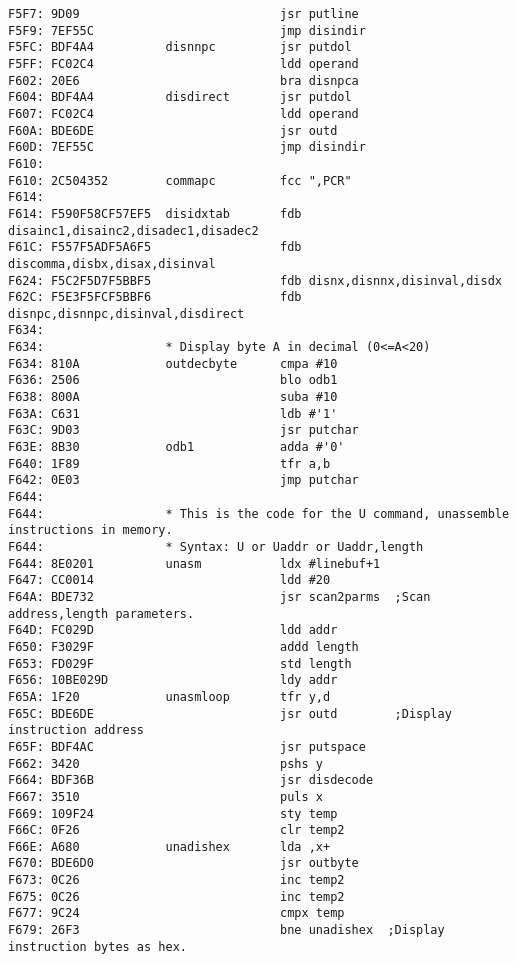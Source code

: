 {\begin{verbatim}
F5F7: 9D09                            jsr putline
F5F9: 7EF55C                          jmp disindir
F5FC: BDF4A4          disnnpc         jsr putdol
F5FF: FC02C4                          ldd operand
F602: 20E6                            bra disnpca
F604: BDF4A4          disdirect       jsr putdol
F607: FC02C4                          ldd operand
F60A: BDE6DE                          jsr outd                
F60D: 7EF55C                          jmp disindir
F610:                 
F610: 2C504352        commapc         fcc ",PCR"
F614:                 
F614: F590F58CF57EF5  disidxtab       fdb disainc1,disainc2,disadec1,disadec2
F61C: F557F5ADF5A6F5                  fdb discomma,disbx,disax,disinval
F624: F5C2F5D7F5BBF5                  fdb disnx,disnnx,disinval,disdx
F62C: F5E3F5FCF5BBF6                  fdb disnpc,disnnpc,disinval,disdirect           
F634:                 
F634:                 * Display byte A in decimal (0<=A<20)
F634: 810A            outdecbyte      cmpa #10
F636: 2506                            blo odb1
F638: 800A                            suba #10
F63A: C631                            ldb #'1'
F63C: 9D03                            jsr putchar
F63E: 8B30            odb1            adda #'0'
F640: 1F89                            tfr a,b
F642: 0E03                            jmp putchar
F644:                                 
F644:                 * This is the code for the U command, unassemble instructions in memory.
F644:                 * Syntax: U or Uaddr or Uaddr,length
F644: 8E0201          unasm           ldx #linebuf+1
F647: CC0014                          ldd #20
F64A: BDE732                          jsr scan2parms  ;Scan address,length parameters.
F64D: FC029D                          ldd addr
F650: F3029F                          addd length
F653: FD029F                          std length
F656: 10BE029D                        ldy addr
F65A: 1F20            unasmloop       tfr y,d
F65C: BDE6DE                          jsr outd        ;Display instruction address
F65F: BDF4AC                          jsr putspace
F662: 3420                            pshs y
F664: BDF36B                          jsr disdecode
F667: 3510                            puls x
F669: 109F24                          sty temp
F66C: 0F26                            clr temp2
F66E: A680            unadishex       lda ,x+
F670: BDE6D0                          jsr outbyte
F673: 0C26                            inc temp2
F675: 0C26                            inc temp2
F677: 9C24                            cmpx temp
F679: 26F3                            bne unadishex  ;Display instruction bytes as hex.

\end{verbatim}}
